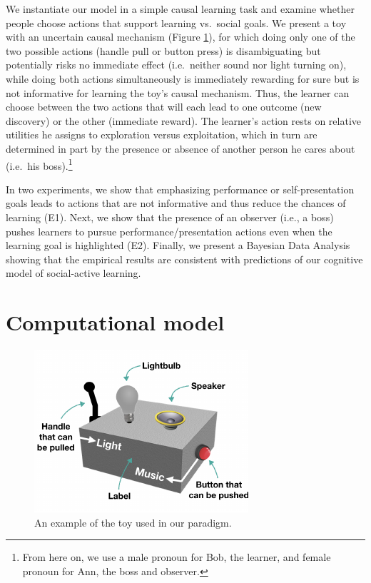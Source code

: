 \documentclass[10pt, letterpaper]{article}
\newenvironment{CodeChunk}{}{}
\begin{document}
We instantiate our model in a simple causal learning task and examine
whether people choose actions that support learning vs.~social goals. We
present a toy with an uncertain causal mechanism (Figure \ref{fig:toy}),
for which doing only one of the two possible actions (handle pull or
button press) is disambiguating but potentially risks no immediate
effect (i.e.~neither sound nor light turning on), while doing both
actions simultaneously is immediately rewarding for sure but is not
informative for learning the toy's causal mechanism. Thus, the learner
can choose between the two actions that will each lead to one outcome
(new discovery) or the other (immediate reward). The learner's action
rests on relative utilities he assigns to exploration versus
exploitation, which in turn are determined in part by the presence or
absence of another person he cares about (i.e.~his
boss).\footnote{From here on, we use a male pronoun for Bob, the learner, and female pronoun for Ann, the boss and observer.}

In two experiments, we show that emphasizing performance or
self-presentation goals leads to actions that are not informative and
thus reduce the chances of learning (E1). Next, we show that the
presence of an observer (i.e., a boss) pushes learners to pursue
performance/presentation actions even when the learning goal is
highlighted (E2). Finally, we present a Bayesian Data Analysis showing
that the empirical results are consistent with predictions of our
cognitive model of social-active learning.

\section{Computational model}\label{computational-model}

\begin{CodeChunk}
\begin{figure}[t]

{\centering \includegraphics[width=0.8\linewidth]{figs/toy-1} 

}

\caption[An example of the toy used in our paradigm]{An example of the toy used in our paradigm.}\label{fig:toy}
\end{figure}
\end{CodeChunk}
\end{document}
